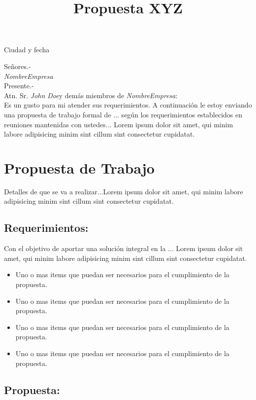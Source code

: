 \documentclass[letterpaper,12pt]{dasesu_article}
\title{Propuesta XYZ}
\newcommand{\nameproy}{\textit{NombreEmpresa}}
\newcommand{\nameclient}{\textit{John Doe}}
\begin{document}
\begin{flushright}
\hspace*{2em}Ciudad y fecha
\end{flushright}

Señores.-\\
\nameproy\\
Presente.-\\

Atn. Sr. \nameclient y demás miembros de \nameproy:\\

Es un gusto para mi atender sus requerimientos. A continuación le estoy enviando una propuesta de trabajo formal de ... según los requerimientos establecidos en reuniones mantenidas con ustedes... Lorem ipsum dolor sit amet, qui minim labore adipisicing minim sint cillum sint consectetur cupidatat.

\section{Propuesta de Trabajo}

Detalles de que se va a realizar...Lorem ipsum dolor sit amet, qui minim labore adipisicing minim sint cillum sint consectetur cupidatat.

\subsection{Requerimientos:}

Con el objetivo de aportar una solución integral en la ... Lorem ipsum dolor sit amet, qui minim labore adipisicing minim sint cillum sint consectetur cupidatat.

\begin{itemize}
	\item Uno o mas items que puedan ser necesarios para el cumplimiento de la propuesta.
	\item Uno o mas items que puedan ser necesarios para el cumplimiento de la propuesta.
	\item Uno o mas items que puedan ser necesarios para el cumplimiento de la propuesta.
	\item Uno o mas items que puedan ser necesarios para el cumplimiento de la propuesta.
\end{itemize}

\subsection{Propuesta:}
\end{document}

